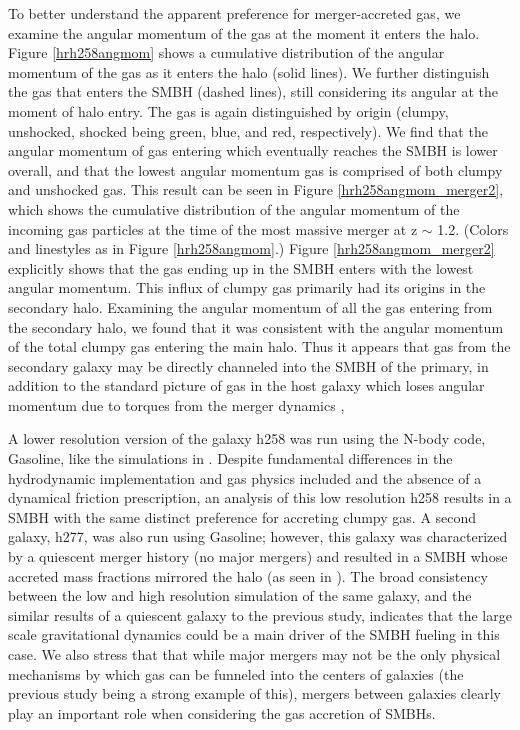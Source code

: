 \documentclass[]{emulateapj}
\begin{document}
To better understand the apparent preference for merger-accreted gas, we examine the angular momentum of the gas at the moment it enters the halo. Figure \ref{hrh258angmom} shows a cumulative distribution of the angular momentum of the gas as it enters the halo (solid lines). We further distinguish the gas that enters the SMBH (dashed lines), still considering its angular at the moment of halo entry. The gas is again distinguished by origin (clumpy, unshocked, shocked being green, blue, and red, respectively). We find that the angular momentum of gas entering which eventually reaches the SMBH is lower overall, and that the lowest angular momentum gas is comprised of both clumpy and unshocked gas. This result can be seen in Figure \ref{hrh258angmom_merger2}, which shows the cumulative distribution of the angular momentum of the incoming gas particles at the time of the most massive merger at z $\sim$ 1.2. (Colors and linestyles as in Figure \ref{hrh258angmom}.) Figure \ref{hrh258angmom_merger2} explicitly shows that the gas ending up in the SMBH enters with the lowest angular momentum. This influx of clumpy gas primarily had its origins in the secondary halo. Examining the angular momentum of all the gas entering from the secondary halo, we found that it was consistent with the angular momentum of the total clumpy gas entering the main halo.  Thus it appears that gas from the secondary galaxy may be directly channeled into the SMBH of the primary, in addition to the standard picture of gas in the host galaxy which loses angular momentum due to torques from the merger dynamics \citep{Capelo2015}, 

A lower resolution version of the galaxy h258 was run using the N-body code, Gasoline, like the simulations in \cite{Bellovary2013}. Despite fundamental differences in the hydrodynamic implementation and gas physics included and the absence of a dynamical friction prescription, an analysis of this low resolution h258 results in a SMBH with the same distinct preference for accreting clumpy gas. A second galaxy, h277, was also run using Gasoline; however, this galaxy was characterized by a quiescent merger history (no major mergers) and resulted in a SMBH whose accreted mass fractions mirrored the halo (as seen in \cite{Bellovary2013}). The broad consistency between the low and high resolution simulation of the same galaxy, and the similar results of a quiescent galaxy to the previous study, indicates that the large scale gravitational dynamics could be a main driver of the SMBH fueling in this case. We also stress that that while major mergers may not be the only physical mechanisms by which gas can be funneled into the centers of galaxies (the previous study being a strong example of this), mergers between galaxies clearly play an important role when considering the gas accretion of SMBHs.
\end{document}
